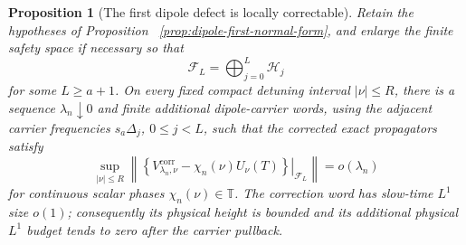 \documentclass[11pt]{article}
\newtheorem{proposition}[theorem]{Proposition}
\theoremstyle{remark}
\begin{document}
\begin{proposition}[The first dipole defect is locally correctable]
\label{prop:dipole-first-defect-correctable}
Retain the hypotheses of Proposition
~\ref{prop:dipole-first-normal-form}, and enlarge the finite safety space if
necessary so that
\[
 \mathcal F_L=\bigoplus_{j=0}^{L}\mathcal H_j
\]
for some $L\geq a+1$.  On every fixed compact detuning interval
$|\nu|\leq R$, there is a sequence $\lambda_n\downarrow0$ and finite
additional dipole-carrier words, using the adjacent carrier frequencies
$s_a\Delta_j$, $0\leq j<L$, such that the corrected exact propagators satisfy
\begin{equation}
 \sup_{|\nu|\leq R}
 \left\|
 \left.
 \left\{
 V^{\mathrm{corr}}_{\lambda_n,\nu}
 -\chi_n(\nu)U_\nu(T)
 \right\}
 \right|_{\mathcal F_L}
 \right\|
 =o(\lambda_n)
 \label{eq:dipole-locally-corrected-endpoint}
\end{equation}
for continuous scalar phases $\chi_n(\nu)\in\mathbb T$.
The correction word has slow-time $L^1$ size $o(1)$; consequently its
physical height is bounded and its additional physical $L^1$ budget tends
to zero after the carrier pullback.
\end{proposition}
\end{document}
